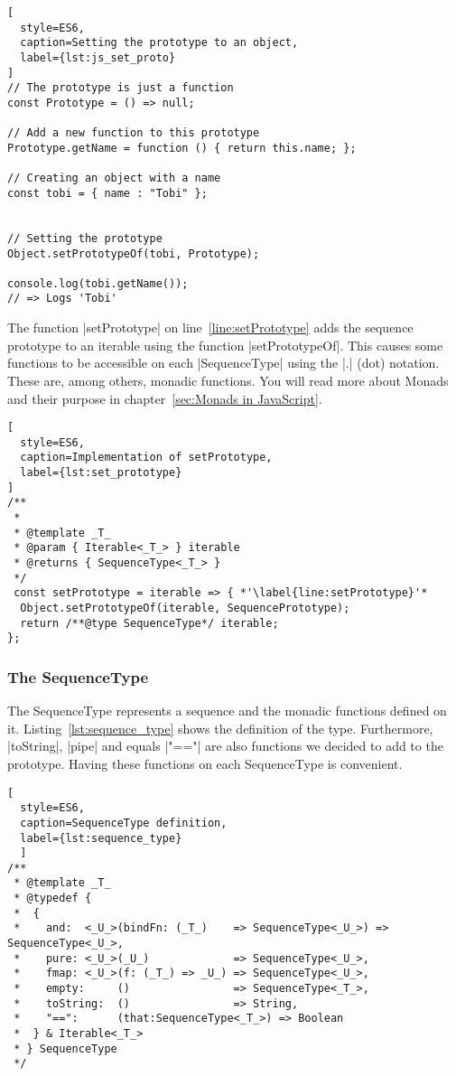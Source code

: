 \begin{lstlisting}[
  style=ES6,
  caption=Setting the prototype to an object,
  label={lst:js_set_proto}
]
// The prototype is just a function
const Prototype = () => null; 

// Add a new function to this prototype
Prototype.getName = function () { return this.name; };

// Creating an object with a name
const tobi = { name : "Tobi" };


// Setting the prototype
Object.setPrototypeOf(tobi, Prototype);

console.log(tobi.getName());
// => Logs 'Tobi' 
\end{lstlisting}


The function |setPrototype| on line~\ref{line:setPrototype} adds the sequence
prototype to an iterable using the function |setPrototypeOf|. This causes some
functions to be accessible on each |SequenceType| using the |.| (dot) notation. These are,
among others, monadic functions. You will read more about Monads and their
purpose in chapter~\ref{sec:Monads in JavaScript}.
\begin{lstlisting}[
  style=ES6,
  caption=Implementation of setPrototype,
  label={lst:set_prototype}
]
/**
 *
 * @template _T_
 * @param { Iterable<_T_> } iterable
 * @returns { SequenceType<_T_> }
 */
 const setPrototype = iterable => { *'\label{line:setPrototype}'*
  Object.setPrototypeOf(iterable, SequencePrototype);
  return /**@type SequenceType*/ iterable;
};
\end{lstlisting}

\subsubsection{The SequenceType} %
\label{subsub:The SequenceType}

The SequenceType represents a sequence and the monadic functions defined on it. 
Listing~\ref{lst:sequence_type} shows the definition of the type.
Furthermore, |toString|, |pipe| and equals |"=="| are also functions we decided to add to the
prototype. Having these functions on each SequenceType is convenient.

\begin{lstlisting}[
  style=ES6, 
  caption=SequenceType definition,
  label={lst:sequence_type}
  ]
/**
 * @template _T_
 * @typedef {
 *  {
 *    and:  <_U_>(bindFn: (_T_)    => SequenceType<_U_>) => SequenceType<_U_>,
 *    pure: <_U_>(_U_)             => SequenceType<_U_>,
 *    fmap: <_U_>(f: (_T_) => _U_) => SequenceType<_U_>,
 *    empty:     ()                => SequenceType<_T_>,
 *    toString:  ()                => String,
 *    "==":      (that:SequenceType<_T_>) => Boolean
 *  } & Iterable<_T_>
 * } SequenceType
 */
\end{lstlisting}

